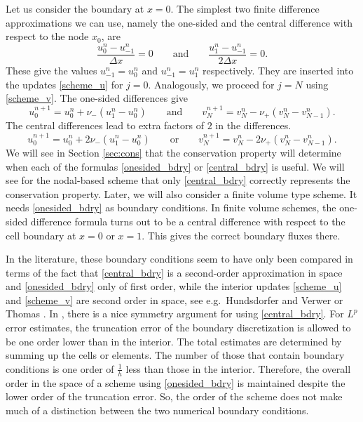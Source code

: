 Let us consider the boundary at $x=0$. The simplest
two finite difference approximations we can use, namely the one-sided and the central difference with respect
to the node $x_0$, are
%
\begin{equation}
\label{bdry_fd}
\frac{u_0^n-u_{-1}^n}{\Delta x} = 0 \qquad \mbox{and}\qquad \frac{u_1^n-u_{-1}^n}{2\Delta x}=0.
\end{equation}
%
These give the values $u_{-1}^n=u_0^n$ and $u_{-1}^n = u_1^n$ respectively. They are inserted into the
updates \eqref{scheme_u} for $j=0$. Analogously, we proceed for $j=N$ using \eqref{scheme_v}. The one-sided differences give
%
\begin{equation}
\label{onesided_bdry}
u^{n+1}_{0}=u_{0}^{n}+\nu_- (u^n_{1}-u_{0}^{n}) \qquad\mbox{and}\qquad v^{n+1}_{N}=v_{N}^{n}-\nu_+ (v^n_{N}-v_{N-1}^{n}).
\end{equation}
%
The central differences lead to extra factors of $2$ in the differences.
%
\begin{equation}
\label{central_bdry}
u^{n+1}_{0}=u_{0}^{n}+2\nu_- (u^n_{1}-u_{0}^{n})\qquad\mbox{or}\qquad v^{n+1}_{N}=v_{N}^{n}-2\nu_+( v^n_{N}-v_{N-1}^{n}).
\end{equation}
%
We will see in Section \ref{sec:cons} that the conservation property will determine when 
each of the formulas \eqref{onesided_bdry} or \eqref{central_bdry}
is useful. We will see for the nodal-based scheme that only \eqref{central_bdry} correctly represents
the conservation property. 
Later, we will also consider a finite volume type scheme. It needs \eqref{onesided_bdry}
as boundary conditions. In finite volume schemes, the one-sided difference formula turns out to be a central 
difference with respect to the cell
boundary at $x=0$ or $x=1$. This gives the correct boundary fluxes there. 

In the literature, these boundary conditions seem to have only been compared
in terms of the fact that \eqref{central_bdry} is a second-order approximation in space and \eqref{onesided_bdry}
only of first order, while the interior updates \eqref{scheme_u} and \eqref{scheme_v} are second order in space, 
see e.g.\ Hundsdorfer and Verwer \cite[Subsection I.5.3]{bHUVE} 
or Thomas \cite[Section 1.4]{bTHO}. In \cite{bHUVE}, there is
a nice symmetry argument for using \eqref{central_bdry}. For $L^p$ error estimates, the truncation error of the boundary
discretization is allowed to be one order lower than in the interior. The total estimates are determined by summing up
the cells or elements. The number of those that contain boundary conditions is one order of $\frac 1h$ less than those
in the interior. Therefore, the overall order in the space of a scheme using \eqref{onesided_bdry} 
is maintained despite the lower
order of the truncation error. So, the order of the scheme does not make much of a distinction 
between the two numerical boundary conditions.

